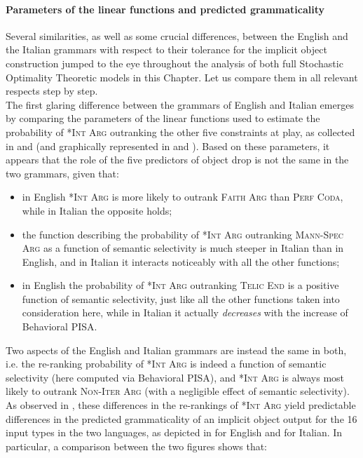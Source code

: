 \paragraph{Parameters of the linear functions and predicted grammaticality}
Several similarities, as well as some crucial differences, between the English and the Italian grammars with respect to their tolerance for the implicit object construction jumped to the eye throughout the analysis of both full Stochastic Optimality Theoretic models in this Chapter. Let us compare them in all relevant respects step by step.\\
The first glaring difference between the grammars of English and Italian emerges by comparing the parameters of the linear functions used to estimate the probability of \textsc{*Int Arg} outranking the other five constraints at play, as collected in  and  (and graphically represented in  and ). Based on these parameters, it appears that the role of the five predictors of object drop is not the same in the two grammars, given that:
\begin{itemize}
    \item in English \textsc{*Int Arg} is more likely to outrank \textsc{Faith Arg} than \textsc{Perf Coda}, while in Italian the opposite holds;
    \item the function describing the probability of \textsc{*Int Arg} outranking \textsc{Mann-Spec Arg} as a function of semantic selectivity is much steeper in Italian than in English, and in Italian it interacts noticeably with all the other functions;
    \item in English the probability of \textsc{*Int Arg} outranking \textsc{Telic End} is a positive function of semantic selectivity, just like all the other functions taken into consideration here, while in Italian it actually \textit{decreases} with the increase of Behavioral PISA.
\end{itemize}
Two aspects of the English and Italian grammars are instead the same in both, i.e. the re-ranking probability of \textsc{*Int Arg} is indeed a function of semantic selectivity (here computed via Behavioral PISA), and \textsc{*Int Arg} is always most likely to outrank \textsc{Non-Iter Arg} (with a negligible effect of semantic selectivity).\\
As observed in , these differences in the re-rankings of \textsc{*Int Arg} yield predictable differences in the predicted grammaticality of an implicit object output for the 16 input types in the two languages, as depicted in  for English and  for Italian. In particular, a comparison between the two figures shows that:

